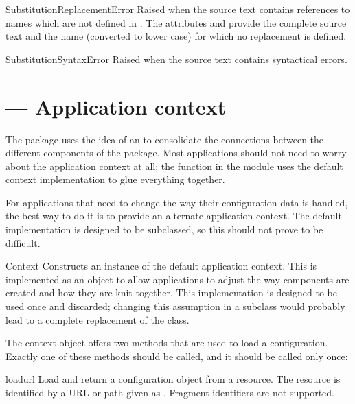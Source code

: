 \documentclass{howto}
\begin{document}
\begin{excdesc}{SubstitutionReplacementError}
  Raised when the source text contains references to names which are
  not defined in .  The attributes  and
   provide the complete source text and the name
  (converted to lower case) for which no replacement is defined.
\end{excdesc}

\begin{excdesc}{SubstitutionSyntaxError}
  Raised when the source text contains syntactical errors.
\end{excdesc}


\section{ --- Application context}


The  package uses the idea of an  to consolidate the connections between the different
components of the package.  Most applications should not need to worry
about the application context at all; the  function
in the  module uses the default context implementation
to glue everything together.

For applications that need to change the way their configuration data
is handled, the best way to do it is to provide an alternate
application context.  The default implementation is designed to be
subclassed, so this should not prove to be difficult.

\begin{classdesc}{Context}{}
  Constructs an instance of the default application context.  This is
  implemented as an object to allow applications to adjust the way
  components are created and how they are knit together.  This
  implementation is designed to be used once and discarded; changing
  this assumption in a subclass would probably lead to a complete
  replacement of the class.
\end{classdesc}

The context object offers two methods that are used to load a
configuration.  Exactly one of these methods should be called, and it
should be called only once:

\begin{methoddesc}{load}{url}
  Load and return a configuration object from a resource.  The
  resource is identified by a URL or path given as .
  Fragment identifiers are not supported.
\end{methoddesc}
\end{document}
